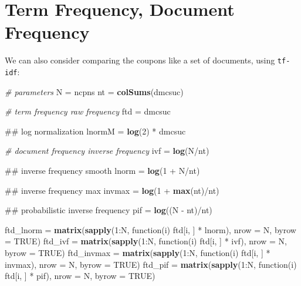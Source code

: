 \documentclass[10pt]{report}
\newenvironment{Shaded}{}{}
\newcommand{\KeywordTok}[1]{\textcolor[rgb]{0.00,0.44,0.13}{\textbf{{#1}}}}
\newcommand{\DataTypeTok}[1]{\textcolor[rgb]{0.56,0.13,0.00}{{#1}}}
\newcommand{\DecValTok}[1]{\textcolor[rgb]{0.25,0.63,0.44}{{#1}}}
\newcommand{\StringTok}[1]{\textcolor[rgb]{0.25,0.44,0.63}{{#1}}}
\newcommand{\CommentTok}[1]{\textcolor[rgb]{0.38,0.63,0.69}{\textit{{#1}}}}
\newcommand{\OtherTok}[1]{\textcolor[rgb]{0.00,0.44,0.13}{{#1}}}
\newcommand{\NormalTok}[1]{{#1}}
\begin{document}
\section{Term Frequency, Document
Frequency}\label{term-frequency-document-frequency}

We can also consider comparing the coupons like a set of documents,
using \verb!tf-idf!:

\begin{Shaded}
\begin{Highlighting}[]
\CommentTok{# parameters}
\NormalTok{N =}\StringTok{ }\NormalTok{ncpns}
\NormalTok{nt =}\StringTok{ }\KeywordTok{colSums}\NormalTok{(dmcsuc)}

\CommentTok{# term frequency raw frequency}
\NormalTok{ftd =}\StringTok{ }\NormalTok{dmcsuc}

\NormalTok{## log normalization}
\NormalTok{lnormM =}\StringTok{ }\KeywordTok{log}\NormalTok{(}\DecValTok{2}\NormalTok{) *}\StringTok{ }\NormalTok{dmcsuc}

\CommentTok{# document frequency inverse frequency}
\NormalTok{ivf =}\StringTok{ }\KeywordTok{log}\NormalTok{(N/nt)}

\NormalTok{## inverse frequency smooth}
\NormalTok{lnorm =}\StringTok{ }\KeywordTok{log}\NormalTok{(}\DecValTok{1} \NormalTok{+}\StringTok{ }\NormalTok{N/nt)}

\NormalTok{## inverse frequency max}
\NormalTok{invmax =}\StringTok{ }\KeywordTok{log}\NormalTok{(}\DecValTok{1} \NormalTok{+}\StringTok{ }\KeywordTok{max}\NormalTok{(nt)/nt)}

\NormalTok{## probabilistic inverse frequency}
\NormalTok{pif =}\StringTok{ }\KeywordTok{log}\NormalTok{((N -}\StringTok{ }\NormalTok{nt)/nt)}

\NormalTok{ftd_lnorm =}\StringTok{ }\KeywordTok{matrix}\NormalTok{(}\KeywordTok{sapply}\NormalTok{(}\DecValTok{1}\NormalTok{:N, function(i) ftd[i, ] *}\StringTok{ }\NormalTok{lnorm), }\DataTypeTok{nrow =} \NormalTok{N, }\DataTypeTok{byrow =} \OtherTok{TRUE}\NormalTok{)}
\NormalTok{ftd_ivf =}\StringTok{ }\KeywordTok{matrix}\NormalTok{(}\KeywordTok{sapply}\NormalTok{(}\DecValTok{1}\NormalTok{:N, function(i) ftd[i, ] *}\StringTok{ }\NormalTok{ivf), }\DataTypeTok{nrow =} \NormalTok{N, }\DataTypeTok{byrow =} \OtherTok{TRUE}\NormalTok{)}
\NormalTok{ftd_invmax =}\StringTok{ }\KeywordTok{matrix}\NormalTok{(}\KeywordTok{sapply}\NormalTok{(}\DecValTok{1}\NormalTok{:N, function(i) ftd[i, ] *}\StringTok{ }\NormalTok{invmax), }\DataTypeTok{nrow =} \NormalTok{N, }\DataTypeTok{byrow =} \OtherTok{TRUE}\NormalTok{)}
\NormalTok{ftd_pif =}\StringTok{ }\KeywordTok{matrix}\NormalTok{(}\KeywordTok{sapply}\NormalTok{(}\DecValTok{1}\NormalTok{:N, function(i) ftd[i, ] *}\StringTok{ }\NormalTok{pif), }\DataTypeTok{nrow =} \NormalTok{N, }\DataTypeTok{byrow =} \OtherTok{TRUE}\NormalTok{)}


\end{Highlighting}
\end{Shaded}
\end{document}
